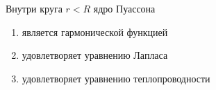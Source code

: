 Внутри круга \(r < R\) ядро Пуассона

\begin{enumerate}[label=\arabic*)]
    \item является гармонической функцией
    \item удовлетворяет уравнению Лапласа
    \item удовлетворяет уравнению теплопроводности
\end{enumerate}

